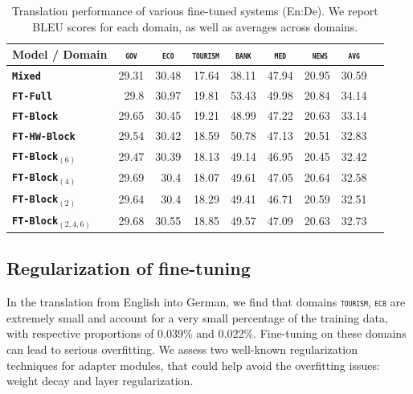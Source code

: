 \documentclass[11pt,a4paper]{article}
\newcommand{\fyTodo}[1]{\Todo[FY:]{\textcolor{orange}{#1}}}
\newcommand{\fyDone}[1]{\done[FY]\Todo[FY:]{\textcolor{orange}{#1}}}
\newcommand{\domain}[1]{\texttt{\textsc{#1}}}
\newcommand{\system}[1]{\texttt{\textbf{#1}}}
\begin{document}
\begin{table}[htbp]
  \centering
  \fyDone{Fix column size}
  \begin{tabular}{|p{3cm}|*{8}{r|}} \hline
    Model / Domain & \multicolumn{1}{c|}{\domain{gov}} & \multicolumn{1}{c|}{\domain{eco}} & \multicolumn{1}{c|}{\domain{tourism}} & \multicolumn{1}{c|}{\domain{bank}} & \multicolumn{1}{c|}{\domain{ med }} & \multicolumn{1}{c|}{\domain{ news}} & \multicolumn{1}{c|}{\domain{avg}} \\ \hline %
    \system{Mixed}  & 29.31 & 30.48 & 17.64 & 38.11 & 47.94 & 20.95  & 30.59 \\
    \system{FT-Full}       & 29.8 & 30.97 & 19.81 & 53.43 & 49.98 & 20.84 & 34.14 \\
   \system{FT-Block}     & 29.65 & 30.45 & 19.21 & 48.99 & 47.22 & 20.63 & 33.14 \\ 
   \system{FT-HW-Block}   & 29.54 & 30.42 & 18.59 & 50.78 & 47.13 & 20.51 & 32.83 \\ 
   \system{FT-Block$_{(6)}$}     & 29.47 & 30.39 & 18.13 & 49.14 & 46.95 & 20.45 & 32.42 \\
   \system{FT-Block$_{(4)}$}     & 29.69 & 30.4 & 18.07 & 49.61 & 47.05 & 20.64 & 32.58 \\
   \system{FT-Block$_{(2)}$}   & 29.64 & 30.4 & 18.29 & 49.41 & 46.71 & 20.59 & 32.51  \\
   \system{FT-Block$_{(2,4,6)}$}  & 29.68  & 30.55 & 18.85 & 49.57 & 47.09 & 20.63 &  32.73  \\
     \hline
  \end{tabular}
  \caption{Translation performance of various fine-tuned systems (En:De). We report BLEU scores for each domain, as well as averages across domains.}
  \label{tab:performance-en-de}
\end{table}

\fyTodo{Why HW worse than standard version ?} \fyTodo{Why is regularization not helping ? It helps for small domain - domain-specific regularization ??}
\subsection{Regularization of fine-tuning}
In the translation from English into German, we find that domains \domain{tourism}, \domain{ecb} are extremely small and account for a very small percentage of the training data, with respective proportions of 0.039\% and 0.022\%. Fine-tuning on these domains can lead to serious overfitting. We assess two well-known regularization techniques for adapter modules, that could help avoid the overfitting issues: weight decay and layer regularization. 
\end{document}
